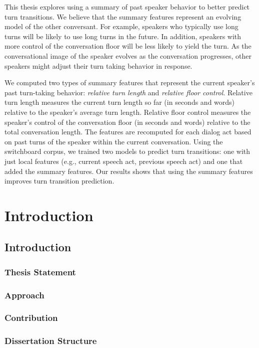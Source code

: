 \documentclass[copyright,masters]{cslu-thesis}
\begin{document}
This thesis explores using a summary of past speaker behavior to better predict turn transitions. We believe that the summary features represent an evolving model of the other conversant. For example, speakers who typically use long turns will be likely to use long turns in the future. In addition, speakers with more control of the conversation floor will be less likely to yield the turn. As the conversational image of the speaker evolves as the conversation progresses, other speakers might adjust their turn taking behavior in response.

We computed two types of summary features that represent the current speaker's past turn-taking behavior: \textit{relative turn length} and \textit{relative floor control}. Relative turn length measures the current turn length so far (in seconds and words) relative to the speaker's average turn length. Relative floor control measures the speaker's control of the conversation floor (in seconds and words) relative to the total conversation length. The features are recomputed for each dialog act based on past turns of the speaker within the current conversation. Using the switchboard corpus, we trained two models to predict turn transitions: one with just local features (e.g., current speech act, previous speech act) and one that added the summary features. Our results shows that using the summary features improves turn transition prediction.


\body


\part{Introduction} %

\chapter{Introduction}

\section{Thesis Statement}

\section{Approach}

\section{Contribution}

\section{Dissertation Structure}

\end{document}
